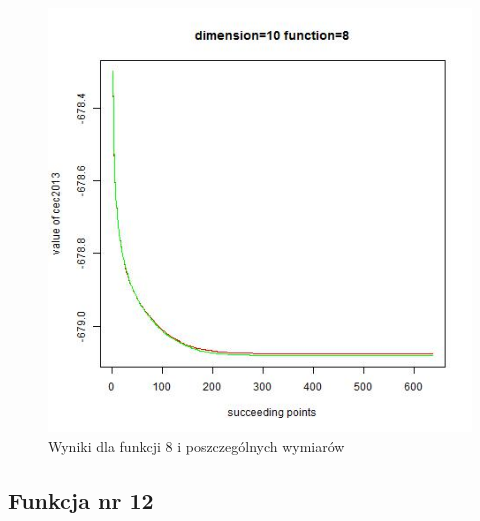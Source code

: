 \documentclass{article}
\begin{document}
\begin{figure}[!htb]
\endminipage\hfill
\includegraphics[scale=0.40]{dim_10__func_8}
\caption{Wyniki dla funkcji 8 i poszczególnych wymiarów}
\end{figure}
\newpage

\subsection{Funkcja nr 12}
\end{document}
